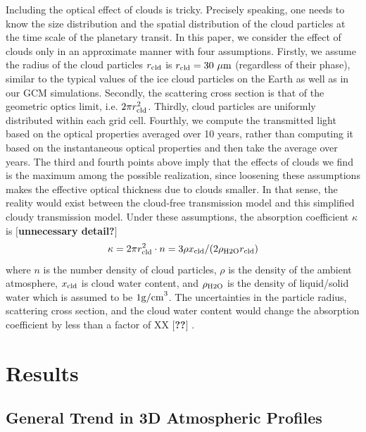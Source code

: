 \documentclass[11pt,numberedappendix,twocolappendix,]{emulateapj}
\def\memo#1{\color{red}$[${\bf #1}$]$ \color{black}}
\begin{document}
Including the optical effect of clouds is tricky. 
Precisely speaking, one needs to know the size distribution and the spatial distribution of the cloud particles at the time scale of the planetary transit. 
In this paper, we consider the effect of clouds only in an approximate manner with four assumptions. 
%
Firstly, we assume the radius of the cloud particles $r_{\rm cld}$ is $r_{\rm cld}=30~\mu {\rm m}$ (regardless of their phase), similar to the typical values of the ice cloud particles on the Earth as well as in our GCM simulations.  
%
Secondly, the scattering cross section is that of the geometric optics limit, i.e. $2 \pi r_{\rm cld}^2$. 
%
Thirdly, cloud particles are uniformly distributed within each grid cell. 
%
Fourthly, we compute the transmitted light based on the optical properties  averaged over 10 years, rather than computing it based on the instantaneous optical properties and then take the average over years. 
%
The third and fourth points above imply that the effects of clouds we find is the maximum among the possible realization, since loosening these assumptions makes the effective optical thickness due to clouds smaller. 
In that sense, the reality would exist between the cloud-free transmission model and this simplified cloudy transmission model. 
Under these assumptions, the absorption coefficient $\kappa $ is \memo{unnecessary detail?}
\begin{equation}
\kappa = 2 \pi r_{\rm cld}^2 \cdot n = 3 \rho x_{\rm cld} / ( 2 \rho_{\rm H2O} r_{\rm cld} )
\end{equation}
where $n$ is the number density of cloud particles, $\rho $ is the density of the ambient atmosphere, $x_{\rm cld}$ is cloud water content, and $\rho_{\rm H2O}$ is the density of liquid/solid water which is assumed to be $1 {\rm g/cm}^3$. 
The uncertainties in the particle radius, scattering cross section, and the cloud water content would change the absorption coefficient by less than a factor of XX \memo{??}.



\section{Results}
\label{s:results}


\subsection{General Trend in 3D Atmospheric Profiles}
\label{ss:result_H2Omixingratio}
\end{document}
